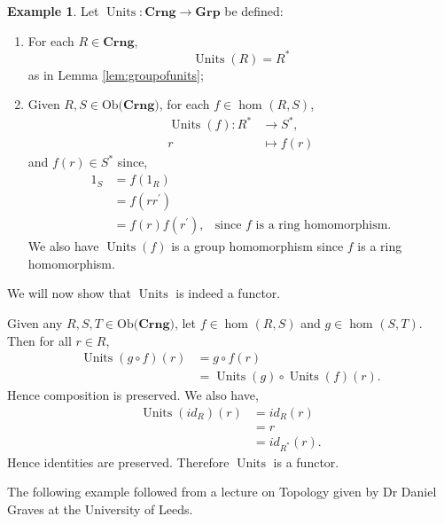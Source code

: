 \documentclass[11pt,a4paper]{article}
\theoremstyle{definition}
\newtheorem{example}[thm]{Example}
\newcommand\ho[3][]{\hom_{#1}(#2,#3)}
\newcommand\ob[1]{\mathrm{Ob(}#1\mathrm{)}}
\newcommand\func[3]{\mathrm{#1}\colon#2\rightarrow#3}
\DeclareMathOperator{\Units}{Units}
\numberwithin{equation}{section}
\begin{document}
\begin{example}
    \label{exe:ringdet}
    Let $\func{\Units}{\mathbf{Crng}}{\mathbf{Grp}}$ be defined:
    \begin{enumerate}
        \item For each $R\in\mathbf{Crng}$,
        \[\Units(R)=R^*\]
        as in Lemma \ref{lem:groupofunits};
    \item Given $R,S\in\ob{\mathbf{Crng}}$, for each $f\in\ho{R}{S}$,
    \begin{align*}
        \Units(f)\colon R^*&\to S^*,\\
        r&\mapsto f(r)
    \end{align*}
    and $f(r)\in S^*$ since,
    \begin{align*}
        1_{S} &= f(1_{R})\\
        &= f(rr^\prime) \\
        &= f(r)f(r^\prime), & \text{since $f$ is a ring homomorphism.}
    \end{align*}
    We also have $\Units(f)$ is a group homomorphism since $f$ is a ring homomorphism.
    \end{enumerate}
    We will now show that $\Units$ is indeed a functor. 
    
    Given any $R,S,T\in\ob{\mathbf{Crng}}$, let $f\in\ho{R}{S}$ and $g\in\ho{S}{T}$. Then for all $r\in R$,
    \begin{align*}
        \Units(g\circ f)(r) &= g\circ f(r)\\
        &= \Units(g)\circ \Units(f)(r).
    \end{align*}
    Hence composition is preserved.
    We also have,
    \begin{align*}
        \Units(id_{R})(r)&= id_{R}(r)\\
        &= r\\
        &= id_{R^*}(r).
        \end{align*}
        Hence identities are preserved.
    Therefore $\Units$ is a functor.
\end{example}
The following example followed from a lecture on Topology given by Dr Daniel Graves at the University of Leeds.
\end{document}
